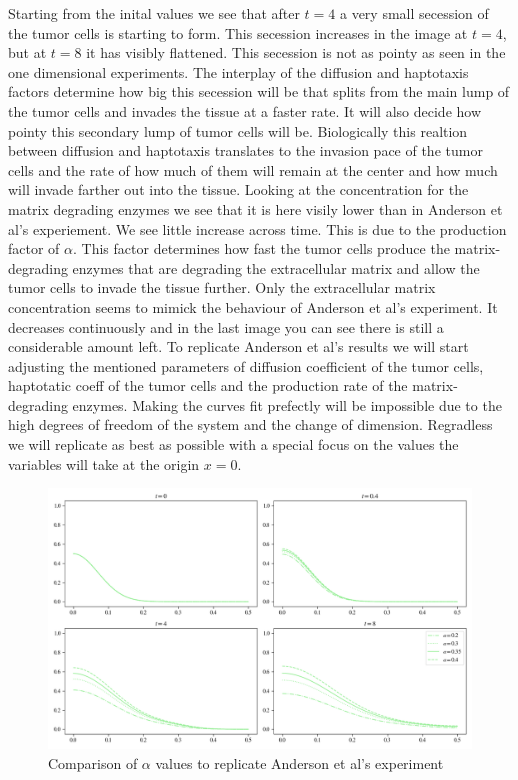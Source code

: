 Starting from the inital values we see that after $t=4$ a very small secession of the tumor cells is starting to form. This secession 
increases in the image at $t=4$, but at $t=8$ it has visibly flattened. This secession is not as pointy as seen in the one dimensional experiments. The interplay of the diffusion and haptotaxis factors determine how big this secession will be that splits from the main lump of the tumor cells and invades the tissue at a faster rate. It will also decide how pointy this secondary lump of tumor cells will be. Biologically this realtion between diffusion and haptotaxis translates to the invasion pace of the tumor cells and the rate of how much of them will remain at the center and how much will invade farther out into the tissue.\newline 
Looking at the concentration for the matrix degrading enzymes we see that it is here visily lower than in Anderson et al's experiement. We see little increase across time. This is due to the production factor of $\alpha$. This factor determines how fast the tumor cells produce the matrix-degrading enzymes that are degrading the extracellular matrix and allow the tumor cells to invade the tissue further.\newline 
Only the extracellular matrix concentration seems to mimick the behaviour of Anderson et al's experiment. It decreases continuously and in the last image you can see there is still a considerable amount left.\newline 
To replicate Anderson et al's results we will start adjusting the mentioned parameters of diffusion coefficient of the tumor cells, haptotatic coeff of the tumor cells and the production rate of the matrix-degrading enzymes. Making the curves fit prefectly will be impossible due to the high degrees of freedom of the system and the change of dimension. Regradless we will replicate as best as possible with a special focus on the values the variables will take at the origin $x=0$.\newline 
\begin{figure}[!htb]
    \centering
    \includegraphics[width=\textwidth]{resources/images/alpha_comparison.png}
    \caption{Comparison of $\alpha$ values to replicate Anderson et al's experiment}
    \label{fig:replication_alpha_comparison}
\end{figure}
